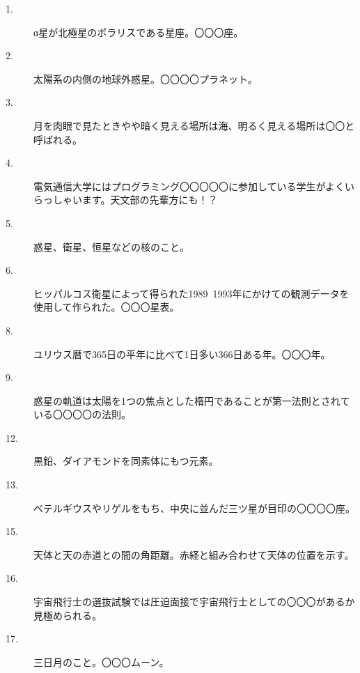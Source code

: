 \documentclass[../../super_nova_2023]{subfiles}
\begin{document}
\vspace{3\zw}
\begin{tcolorbox}[title=たてのカギ]
	\begin{description}
		\item[1. ] α星が北極星のポラリスである星座。〇〇〇座。
		\item[2. ] 太陽系の内側の地球外惑星。〇〇〇〇プラネット。
		\item[3. ] 月を肉眼で見たときやや暗く見える場所は海、明るく見える場所は〇〇と呼ばれる。
		\item[4. ] 電気通信大学にはプログラミング〇〇〇〇〇に参加している学生がよくいらっしゃいます。天文部の先輩方にも！？
		\item[5. ] 惑星、衛星、恒星などの核のこと。
		\item[6. ] ヒッパルコス衛星によって得られた1989~1993年にかけての観測データを使用して作られた。〇〇〇星表。
		\item[8. ] ユリウス暦で365日の平年に比べて1日多い366日ある年。〇〇〇年。
		\item[9. ] 惑星の軌道は太陽を1つの焦点とした楕円であることが第一法則とされている〇〇〇〇の法則。
		\item[12. ] 黒鉛、ダイアモンドを同素体にもつ元素。
		\item[13. ] ベテルギウスやリゲルをもち、中央に並んだ三ツ星が目印の〇〇〇〇座。
		\item[15. ] 天体と天の赤道との間の角距離。赤経と組み合わせて天体の位置を示す。
		\item[16. ] 宇宙飛行士の選抜試験では圧迫面接で宇宙飛行士としての〇〇〇があるか見極められる。
		\item[17. ] 三日月のこと。〇〇〇ムーン。
	\end{description}
\end{tcolorbox}
\vspace{3\zw}
\end{document}

